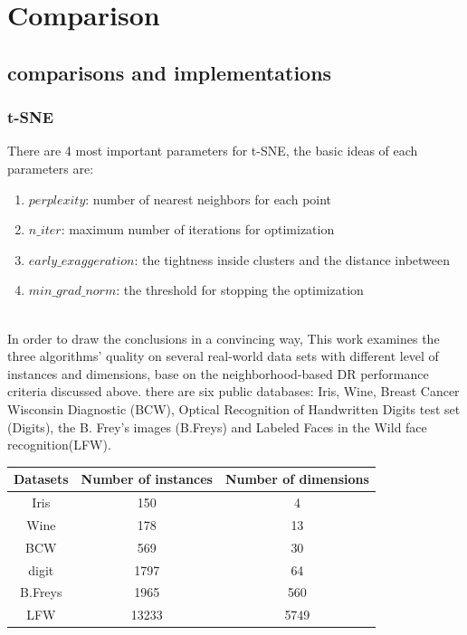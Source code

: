 \part{Comparison} \label{part:Comparison and implementation}

\chapter{comparisons and implementations}

\section{t-SNE}
There are 4 most important parameters for t-SNE, the basic ideas of each parameters are: 

\begin{enumerate}[1)]
\item $perplexity$: number of nearest neighbors for each point
\item $n\_iter$: maximum number of iterations for optimization
\item $early\_exaggeration$: the tightness inside clusters and the distance inbetween
\item $min\_grad\_norm$: the threshold for stopping the optimization 
\end{enumerate}\\

\noindent In order to draw the conclusions in a convincing way, This work examines the three algorithms' quality on several real-world data sets with different level of instances and dimensions, base on the neighborhood-based DR performance criteria discussed above. there are six public databases: Iris, Wine, Breast Cancer Wisconsin Diagnostic (BCW), Optical Recognition of Handwritten Digits test set (Digits), the B. Frey’s images (B.Freys) and Labeled Faces in the Wild face recognition(LFW).\\

\begin{center}
\begin{tabular}{|c|c|c|}%
\hline  %
Datasets & Number of instances & Number of dimensions\\
\hline  %
Iris & 150 & 4\\
\hline  %
Wine & 178 & 13\\
\hline  %
BCW & 569 & 30\\
\hline  %
digit & 1797 & 64\\
\hline  %
B.Freys & 1965 & 560\\
\hline  %
LFW & 13233 & 5749\\
\hline %
\end{tabular}\\
\end{center}
\\

